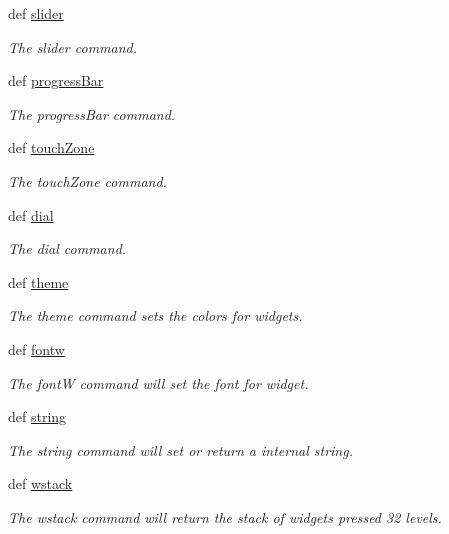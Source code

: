 \begin{DoxyCompactItemize}
def \hyperlink{group___widgets_ga93ee96540f5ffc5c4704f60592074d80}{slider}
\begin{DoxyCompactList}\small\item\em The slider command. \end{DoxyCompactList}\item 
def \hyperlink{group___widgets_ga9eeb62ec0060e5ba57e42986b2d555ae}{progress\-Bar}
\begin{DoxyCompactList}\small\item\em The progress\-Bar command. \end{DoxyCompactList}\item 
def \hyperlink{group___widgets_gaeb901f189e33956b4cd51fbd78bcf957}{touch\-Zone}
\begin{DoxyCompactList}\small\item\em The touch\-Zone command. \end{DoxyCompactList}\item 
def \hyperlink{group___widgets_ga0122f7d8c41bb07221be8a778ca8fd53}{dial}
\begin{DoxyCompactList}\small\item\em The dial command. \end{DoxyCompactList}\item 
def \hyperlink{group___widgets_ga334488d30595cf0dd9e2742c65558e2c}{theme}
\begin{DoxyCompactList}\small\item\em The theme command sets the colors for widgets. \end{DoxyCompactList}\item 
def \hyperlink{group___widgets_ga0efc2d431900e2b77a30e19bb556fb3a}{fontw}
\begin{DoxyCompactList}\small\item\em The font\-W command will set the font for widget. \end{DoxyCompactList}\item 
def \hyperlink{group___widgets_gae2b2686b92f93d6fc84de7a19518a89f}{string}
\begin{DoxyCompactList}\small\item\em The string command will set or return a internal string. \end{DoxyCompactList}\item 
def \hyperlink{group___widgets_ga223301539fa77d634fc44b480a08f6a7}{wstack}
\begin{DoxyCompactList}\small\item\em The wstack command will return the stack of widgets pressed 32 levels. \end{DoxyCompactList}\item 

\end{DoxyCompactItemize}
